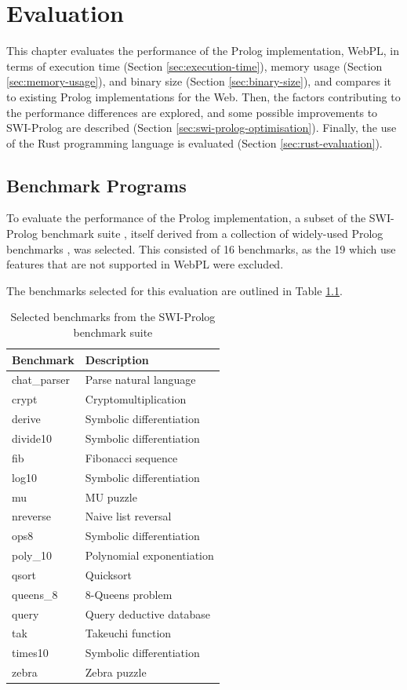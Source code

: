 \chapter{Evaluation}

This chapter evaluates the performance of the Prolog implementation, WebPL, in terms of execution time (Section \ref{sec:execution-time}), memory usage (Section \ref{sec:memory-usage}), and binary size (Section \ref{sec:binary-size}), and compares it to existing Prolog implementations for the Web. Then, the factors contributing to the performance differences are explored, and some possible improvements to SWI-Prolog are described (Section \ref{sec:swi-prolog-optimisation}). Finally, the use of the Rust programming language is evaluated (Section \ref{sec:rust-evaluation}).

\section{Benchmark Programs}

To evaluate the performance of the Prolog implementation, a subset of the SWI-Prolog benchmark suite \cite{wielemakerSWIPrologbenchmarksuite2010}, itself derived from a collection of widely-used Prolog benchmarks \cite{haygoodPrologBenchmarkSuite1989}, was selected. This consisted of 16 benchmarks, as the 19 which use features that are not supported in WebPL were excluded.

The benchmarks selected for this evaluation are outlined in Table \ref{tab:benchmarks}.

\begin{table}[H]
\centering
\begin{tabular}{ll}
\hline
\textbf{Benchmark} & \textbf{Description} \\
\hline
chat\_parser & Parse natural language \\
crypt & Cryptomultiplication \\
derive & Symbolic differentiation \\
divide10 & Symbolic differentiation \\
fib & Fibonacci sequence \\
log10 & Symbolic differentiation \\
mu & MU puzzle \\
nreverse & Naive list reversal \\
ops8 & Symbolic differentiation \\
poly\_10 & Polynomial exponentiation \\
qsort & Quicksort \\
queens\_8 & 8-Queens problem \\
query & Query deductive database \\
tak & Takeuchi function \\
times10 & Symbolic differentiation \\
zebra & Zebra puzzle \\
\hline
\end{tabular}
\caption{Selected benchmarks from the SWI-Prolog benchmark suite}
\label{tab:benchmarks}
\end{table}

